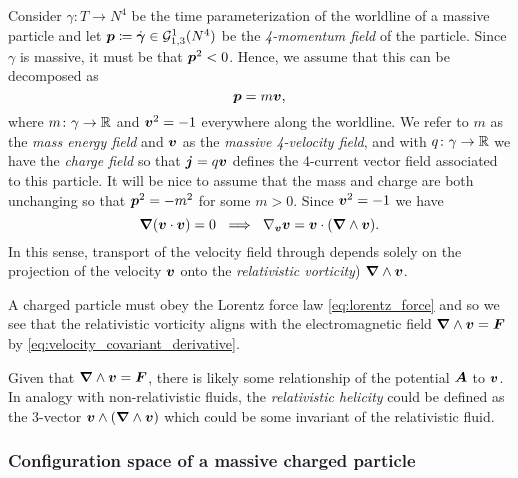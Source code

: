 \documentclass[conf]{new-aiaa}
\begin{document}
Consider $\gamma \colon T \to N^4$ be the time parameterization of the worldline of a massive particle and let $\boldsymbol{p} \coloneqq \dot{\boldsymbol{\gamma}} \in \mathcal{G}_{1,3}^1(N^4)$ be the \emph{4-momentum field} of the particle. Since $\gamma$ is massive, it must be that $\boldsymbol{p}^2<0$. Hence, we assume that this can be decomposed as
\begin{equation}
    \boldsymbol{p} = m \boldsymbol{v},
\end{equation}
where $m\colon \gamma \to \mathbb{R}$ and $\boldsymbol{v}^2=-1$ everywhere along the worldline. We refer to $m$ as the \emph{mass energy field} and $\boldsymbol{v}$ as the \emph{massive 4-velocity field}, and with $q\colon \gamma \to \mathbb{R}$ we have the \emph{charge field} so that $\boldsymbol{j}=q\boldsymbol{v}$ defines the $4$-current vector field associated to this particle. It will be nice to assume that the mass and charge are both unchanging so that $\boldsymbol{p}^2=-m^2$ for some $m>0$. Since $\boldsymbol{v}^2=-1$ we have
\begin{equation}
\label{eq:velocity_covariant_derivative}
    \boldsymbol{\nabla} ({\boldsymbol{v}} \cdot {\boldsymbol{v}}) = 0 ~\implies~ \nabla_{\boldsymbol{v}} {\boldsymbol{v}} =  {\boldsymbol{v}}\cdot (\boldsymbol{\nabla} \wedge {\boldsymbol{v}}).
\end{equation}
In this sense, transport of the velocity field through depends solely on the projection of the velocity ${\boldsymbol{v}}$ onto the \emph{relativistic vorticity}) $\boldsymbol{\nabla} \wedge {\boldsymbol{v}}$.

A charged particle must obey the Lorentz force law \cref{eq:lorentz_force} and so we see that the relativistic vorticity aligns with the electromagnetic field $\boldsymbol{\nabla} \wedge \boldsymbol{v} = \boldsymbol{F}$ by \cref{eq:velocity_covariant_derivative}.

\begin{remark}
Given that $\boldsymbol{\nabla} \wedge \boldsymbol{v} = \boldsymbol{F}$, there is likely some relationship of the potential $\boldsymbol{A}$ to $\boldsymbol{v}$. In analogy with non-relativistic fluids, the \emph{relativistic helicity} could be defined as the 3-vector $\boldsymbol{v}\wedge (\boldsymbol{\nabla} \wedge \boldsymbol{v})$ which could be some invariant of the relativistic fluid.
\end{remark}



\subsubsection{Configuration space of a massive charged particle}
\end{document}
